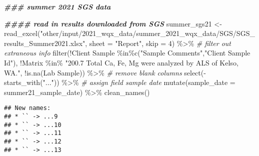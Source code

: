 \documentclass[
]{book}
\newenvironment{Shaded}{\begin{snugshade}}{\end{snugshade}}
\newcommand{\AttributeTok}[1]{\textcolor[rgb]{0.77,0.63,0.00}{#1}}
\newcommand{\CommentTok}[1]{\textcolor[rgb]{0.56,0.35,0.01}{\textit{#1}}}
\newcommand{\DecValTok}[1]{\textcolor[rgb]{0.00,0.00,0.81}{#1}}
\newcommand{\DocumentationTok}[1]{\textcolor[rgb]{0.56,0.35,0.01}{\textbf{\textit{#1}}}}
\newcommand{\FunctionTok}[1]{\textcolor[rgb]{0.00,0.00,0.00}{#1}}
\newcommand{\NormalTok}[1]{#1}
\newcommand{\OtherTok}[1]{\textcolor[rgb]{0.56,0.35,0.01}{#1}}
\newcommand{\SpecialCharTok}[1]{\textcolor[rgb]{0.00,0.00,0.00}{#1}}
\newcommand{\StringTok}[1]{\textcolor[rgb]{0.31,0.60,0.02}{#1}}
\begin{document}
\begin{Shaded}
\begin{Highlighting}[]
\DocumentationTok{\#\#\# summer 2021 SGS data}

\DocumentationTok{\#\#\#\# read in results downloaded from SGS }
\NormalTok{summer\_sgs21 }\OtherTok{\textless{}{-}} \FunctionTok{read\_excel}\NormalTok{(}\StringTok{"other/input/2021\_wqx\_data/summer\_2021\_wqx\_data/SGS/SGS\_results\_Summer2021.xlsx"}\NormalTok{, }\AttributeTok{sheet =} \StringTok{"Report"}\NormalTok{, }\AttributeTok{skip =} \DecValTok{4}\NormalTok{) }\SpecialCharTok{\%\textgreater{}\%}
  \CommentTok{\# filter out extraneous info}
  \FunctionTok{filter}\NormalTok{(}\SpecialCharTok{!}\StringTok{\textasciigrave{}}\AttributeTok{Client Sample}\StringTok{\textasciigrave{}} \SpecialCharTok{\%in\%}\FunctionTok{c}\NormalTok{(}\StringTok{"Sample Comments"}\NormalTok{,}\StringTok{"Client Sample Id"}\NormalTok{),}
         \SpecialCharTok{!}\StringTok{\textasciigrave{}}\AttributeTok{Matrix}\StringTok{\textasciigrave{}} \SpecialCharTok{\%in\%} \StringTok{"200.7 Total Ca, Fe, Mg were analyzed by ALS of Kelso, WA."}\NormalTok{,}
         \SpecialCharTok{!}\FunctionTok{is.na}\NormalTok{(}\StringTok{\textasciigrave{}}\AttributeTok{Lab Sample}\StringTok{\textasciigrave{}}\NormalTok{)) }\SpecialCharTok{\%\textgreater{}\%}
  \CommentTok{\# remove blank columns}
  \FunctionTok{select}\NormalTok{(}\SpecialCharTok{{-}}\FunctionTok{starts\_with}\NormalTok{(}\StringTok{"..."}\NormalTok{)) }\SpecialCharTok{\%\textgreater{}\%}
  \CommentTok{\# assign field sample date}
  \FunctionTok{mutate}\NormalTok{(}\AttributeTok{sample\_date =}\NormalTok{ summer21\_sample\_date) }\SpecialCharTok{\%\textgreater{}\%}
  \FunctionTok{clean\_names}\NormalTok{()}
\end{Highlighting}
\end{Shaded}

\begin{verbatim}
## New names:
## * `` -> ...9
## * `` -> ...10
## * `` -> ...11
## * `` -> ...12
## * `` -> ...13
\end{verbatim}
\end{document}
